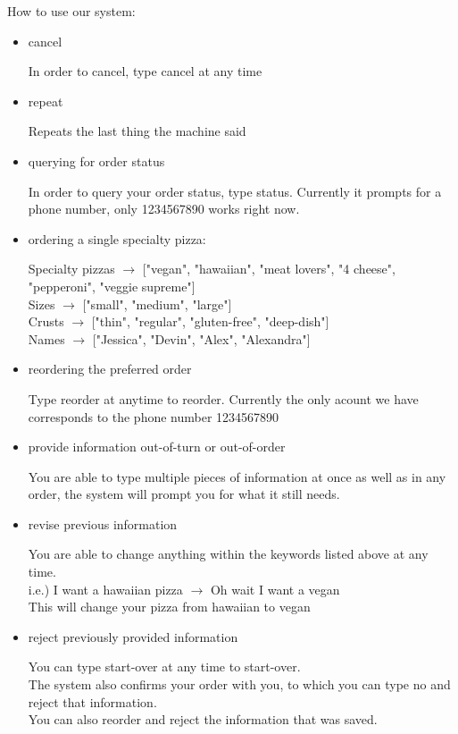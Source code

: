 \documentclass{article}
\begin{document}
How to use our system:
\begin{itemize}

	\item cancel

In order to cancel, type cancel at any time

	\item repeat
	
Repeats the last thing the machine said

	\item querying for order status

In order to query your order status, type status.
Currently it prompts for a phone number, only 1234567890 works right now.

	\item ordering a single specialty pizza:
	
Specialty pizzas $\rightarrow$ ["vegan", "hawaiian", "meat lovers", "4 cheese", "pepperoni", "veggie supreme"]\\
Sizes $\rightarrow$ ["small", "medium", "large"]\\
Crusts $\rightarrow$ ["thin", "regular", "gluten-free", "deep-dish"]\\
Names $\rightarrow$ ["Jessica", "Devin", "Alex", "Alexandra"]\\

	\item reordering the preferred order
	
Type reorder at anytime to reorder. Currently the only acount we have corresponds to the phone number 1234567890

	\item provide information out-of-turn or out-of-order
	
You are able to type multiple pieces of information at once as well as in any order, the system will prompt you for what it still needs.

	\item revise previous information
	
You are able to change anything within the keywords listed above at any time.\\
i.e.) I want a hawaiian pizza $\rightarrow$ Oh wait I want a vegan\\
This will change your pizza from hawaiian to vegan

	\item reject previously provided information
	
You can type start-over at any time to start-over.\\
The system also confirms your order with you, to which you can type no and reject that information.\\
You can also reorder and reject the information that was saved.

\end{itemize}
\end{document}
